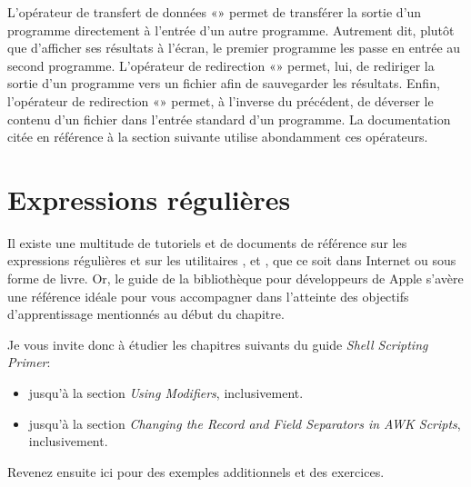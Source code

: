 L'opérateur de transfert de données  «\code{\textbar}» permet de transférer la sortie d'un
programme directement à l'entrée d'un autre programme. Autrement dit,
plutôt que d'afficher ses résultats à l'écran, le premier programme
les passe en entrée au second programme. L'opérateur de redirection
«\code{>}» permet, lui, de rediriger la
sortie d'un programme vers un fichier afin de sauvegarder les
résultats. Enfin, l'opérateur de redirection «\code{<}» permet, à l'inverse du précédent, de déverser le
contenu d'un fichier dans l'entrée standard d'un programme. La
documentation citée en référence à la section suivante utilise
abondamment ces opérateurs.


\section{Expressions régulières}
\label{sec:texte:regex}

Il existe une multitude de tutoriels et de documents de référence sur
les expressions régulières et sur les utilitaires ,
 et , que ce soit dans Internet ou sous forme de
livre. Or, le guide  de la bibliothèque
pour développeurs de Apple \citep{Apple:shellprimer} s'avère une
référence idéale pour vous accompagner dans l'atteinte des objectifs
d'apprentissage mentionnés au début du chapitre.


Je vous invite donc à étudier les chapitres suivants du guide
\emph{Shell Scripting Primer}:
\begin{itemize}
\item
   jusqu'à la section \emph{Using
    Modifiers}, inclusivement.
\item
   jusqu'à la section \emph{Changing the Record and
    Field Separators in AWK Scripts}, inclusivement.
\end{itemize}
Revenez ensuite ici pour des exemples additionnels et des exercices.

